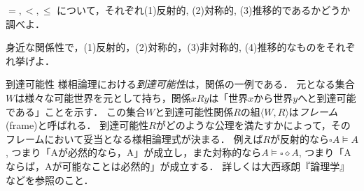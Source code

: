 \documentclass[dvipdfmx, 11pt,a4paper]{jsarticle}
\begin{document}
\begin{renshu}{}{}
 $=, <, \leq$ について，それぞれ(1)反射的, (2)対称的, (3)推移的であるかどうか調べよ．
\end{renshu}


\begin{renshu}{}{}
身近な関係性で，(1)反射的，(2)対称的，(3)非対称的, (4)推移的なものをそれぞれ挙げよ．
\end{renshu}



\begin{rei}{到達可能性}{}
様相論理における\emph{到達可能性}は，関係の一例である．
元となる集合$W$は様々な可能世界を元として持ち，関係$xRy$は「世界$x$から世界$y$へと到達可能である」ことを示す．
この集合$W$と到達可能性関係$R$の組$\langle W, R \rangle$は\emph{フレーム}(frame)と呼ばれる．
到達可能性$R$がどのような公理を満たすかによって，そのフレームにおいて妥当となる様相論理式が決まる．
例えば$R$が反射的なら$\square A \models A$, つまり「Aが必然的なら，A」が成立し，また対称的なら$A \models \square \diamond A$, つまり「Aならば，Aが可能なことは必然的」が成立する．
詳しくは大西琢朗『論理学』などを参照のこと．
\end{rei}
\end{document}
